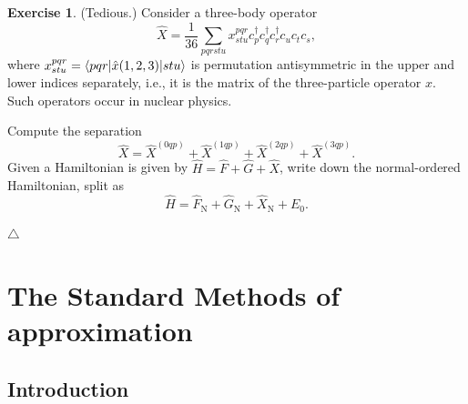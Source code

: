 \documentclass{report}
\theoremstyle{plain}
\theoremstyle{definition}
\newtheorem{exerc}{Exercise}[chapter]
\newcommand\xqed[1]{%
  \leavevmode\unskip\penalty9999 \hbox{}\nobreak\hfill
  \quad\hbox{#1}}
\newcommand\demo{\xqed{$\triangle$}}
\newenvironment{exercise}{\bigskip\begin{exerc}}{\demo\end{exerc}\bigskip}
\begin{document}





\begin{exercise} (Tedious.)
  Consider a three-body operator
  \begin{equation}
    \hat{X} = \frac{1}{36} \sum_{pqrstu} x^{pqr}_{stu} c^\dag_p
    c^\dag_q c^\dag_r c_u c_t c_s,
  \end{equation}
  where $x^{pqr}_{stu} = \braket{pqr|\hat{x}(1,2,3)|stu}$ is
  permutation antisymmetric in the upper and 
  lower indices separately, i.e., it is the matrix of the
  three-particle operator $x$. Such operators occur in nuclear
  physics.

  Compute the separation
  \begin{equation}
    \hat{X} = \hat{X}^{(0qp)} + \hat{X}^{(1qp)} + \hat{X}^{(2qp)} + \hat{X}^{(3qp)}.
  \end{equation}
  Given a Hamiltonian is given by $\hat{H} = \hat{F} + \hat{G} +
  \hat{X}$, write down the normal-ordered Hamiltonian, split as
  \begin{equation}
    \hat{H} = \hat{F}_\text{N} + \hat{G}_\text{N} + \hat{X}_\text{N} + E_0.
  \end{equation}
  
\end{exercise}

\chapter{The Standard Methods of approximation}


\section{Introduction}
\end{document}
